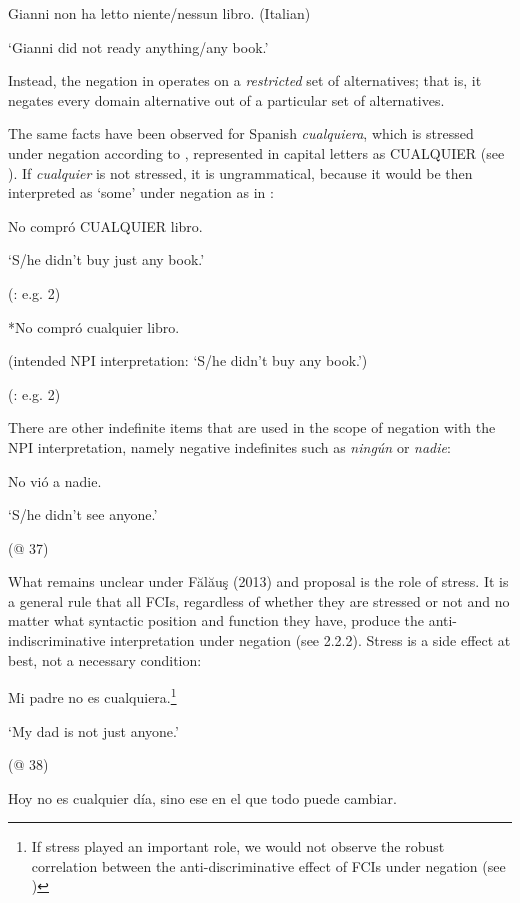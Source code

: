 \documentclass[output=paper]{langscibook}
\begin{document}
  Gianni non ha letto niente/nessun libro.  (Italian)

  ‘Gianni did not ready anything/any book.’

Instead, the negation in  operates on a \textit{restricted} set of alternatives; that is, it negates every domain alternative out of a particular set of alternatives.

  The same facts have been observed for Spanish \textit{cualquiera}, which is stressed under negation according to \citet{Arregui2006}, represented in capital letters as CUALQUIER (see \citealt{Arregui2006}). If \textit{cualquier} is not stressed, it is ungrammatical, because it would be then interpreted as ‘some’ under negation as in :

  No compró \MakeUppercase{cualquier} libro.

  ‘S/he didn't buy just any book.’

  (\citealt{Arregui2006}: e.g. 2)

\label{bkm:Ref533953565}  *No compró cualquier libro.

  (intended NPI interpretation: ‘S/he didn’t buy any book.’) 

  (\citealt{Arregui2006}: e.g. 2)

There are other indefinite items that are used in the scope of negation with the NPI interpretation, namely negative indefinites such as \textit{ningún} or \textit{nadie}:

  No vió a nadie.

  ‘S/he didn’t see anyone.’

  (@ 37)

What remains unclear under Fălăuş (2013) and  proposal is the role of stress. It is a general rule that all FCIs, regardless of whether they are stressed or not and no matter what syntactic position and function they have, produce the anti-indiscriminative interpretation under negation (see 2.2.2). Stress is a side effect at best, not a necessary condition:

\label{bkm:Ref42806294}  Mi padre no es cualquiera.\footnote{If stress played an important role, we would not observe the robust correlation between the anti-discriminative effect of FCIs under negation (see )} 

  ‘My dad is not just anyone.’

  (@ 38)

\label{bkm:Ref42806303}  Hoy no es cualquier día, sino ese en el que todo puede cambiar.
\end{document}
